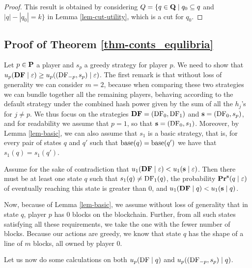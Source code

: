 \begin{proof} 
This result is obtained by considering $Q = \{ q \in \mathbf{Q} \mid q_0 \subseteq q$ and  $|q| - |q_0| = k \}$ in Lemma \ref{lem-cut-utility}, which is a cut for $q_0$.
\end{proof}


\subsection{Proof of Theorem \ref{thm-conts_equlibria}} 

Let $p \in \mathbf{P}$ a player and $s_p$ a greedy strategy for player $p$. We need to show that 
$u_p(\text{\rm {\bf DF}} \mid \varepsilon) \geq u_p( (\text{\rm DF}_{-p},s_p) \mid \varepsilon)$. The first remark is that without loss of generality we can consider 
$m = 2$, because when comparing these two strategies we can bundle together all the remaining players, behaving according to the default strategy
under the combined hash power given by the sum of all the $h_j$'s for $j \neq p$. We thus focus on the strategies 
$\text{\rm {\bf DF}} = (\text{\rm DF}_0,\text{\rm DF}_1)$ and $\mathbf{s} = (\text{\rm DF}_0,s_p)$, and for readability we assume that $p = 1$, so that $\mathbf{s} = (\text{\rm DF}_0,s_1)$.
Moreover, by Lemma \ref{lem-basic}, we can also assume that $s_1$ is a basic strategy, 
that is, for every  pair of states $q$ and $q'$ such that $\text{\rm base}(q) = \text{\rm base}(q')$ we have that $s_1(q) = s_1(q')$.

Assume for the sake of contradiction that $u_1(\text{\rm {\bf DF}} \mid \varepsilon) < u_1( \mathbf{s} \mid \varepsilon)$. Then there must be at least one 
state $q$ such that $s_1(q) \neq \text{\rm DF}_1(q)$, the probability $\mathbf{Pr}^{\mathbf{s}}(q \mid \varepsilon)$ of eventually reaching this state is greater than $0$, and $u_1(\text{\rm {\bf DF}} \mid q) < u_1(\mathbf{s} \mid q)$. 







Now, because of Lemma \ref{lem-basic}, we assume without loss of generality that in state $q$, player $p$ has $0$ blocks on the blockchain. Further, from all such states satisfying all these requirements, we take the one with the fewer number of blocks. Because our actions are greedy, we know that state $q$ has the shape of a line of $m$ blocks, all owned by player $0$. 

Let us now do some calculations on both $u_p(\text{\rm DF} \mid q)$ and $u_p( (\text{\rm DF}_{-p},s_p) \mid q)$. 
\medskip

